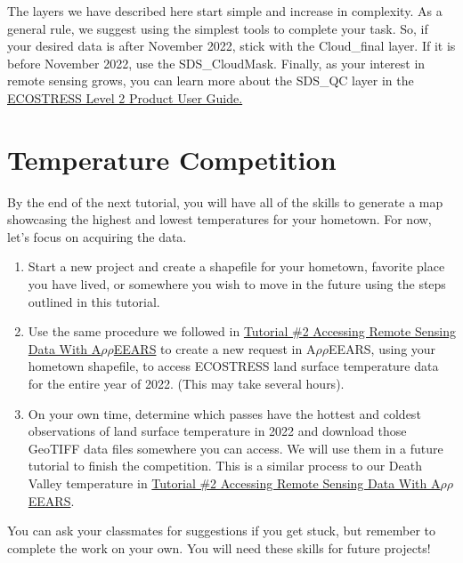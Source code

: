\documentclass[oneside,a4paper,11pt,explicit]{book}
\begin{document}
	\vspace{.5em}
	
	The layers we have described here start simple and increase in complexity. As a general rule, we suggest using the simplest tools to complete your task. So, if your desired data is after November 2022, stick with the Cloud\_final layer. If it is before November 2022, use the SDS\_CloudMask. Finally, as your interest in remote sensing grows, you can learn more about the SDS\_QC layer in the \href{https://lpdaac.usgs.gov/documents/423/ECO2_User_Guide_V1.pdf}{ECOSTRESS Level 2 Product User Guide.}
	
	\section{Temperature Competition}
	
	By the end of the next tutorial, you will have all of the skills to generate a map showcasing the highest and lowest temperatures for your hometown. For now, let's focus on acquiring the data.
	
	\begin{tcolorbox}[enhanced,attach boxed title to top center={yshift=-3mm,yshifttext=-1mm},
		colback=red!5!white,colframe=red!70!blue,colbacktitle=red!70!blue,
		title=Temperature Competition Instructions,fonttitle=\bfseries,
		boxed title style={size=small,colframe=red!50!black} ]
		
		\begin{enumerate}
			\item Start a new project and create a shapefile for your hometown, favorite place you have lived, or somewhere you wish to move in the future using the steps outlined in this tutorial.
			\item  Use the same procedure we followed in \href{https://jeremydforsythe.github.io/icecream-tutorials/Tutorial2_AccessingRemoteSensingDataWithAppears/Tutorial2_AccessingRemoteSensingDataWithAppears.pdf}{Tutorial \#2 Accessing Remote Sensing Data With A$\rho\rho$EEARS} to create a new request in A$\rho\rho$EEARS, using your hometown shapefile, to access ECOSTRESS land surface temperature data for the entire year of 2022. (This may take several hours).
			\item On your own time, determine which passes have the hottest and coldest observations of land surface temperature in 2022 and download those GeoTIFF data files somewhere you can access. We will use them in a future tutorial to finish the competition. This is a similar process to our Death Valley temperature in \href{https://jeremydforsythe.github.io/icecream-tutorials/Tutorial2_AccessingRemoteSensingDataWithAppears/Tutorial2_AccessingRemoteSensingDataWithAppears.pdf}{Tutorial \#2 Accessing Remote Sensing Data With A$\rho\rho$EEARS}.  
		\end{enumerate}
		
		You can ask your classmates for suggestions if you get stuck, but remember to complete the work on your own. You will need these skills for future projects!
		
	\end{tcolorbox} 
	
\end{document}
